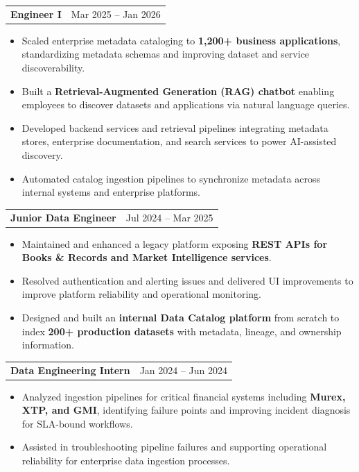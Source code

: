 \documentclass[a4paper,10pt]{article}
\begin{document}
\begin{tabularx}{\linewidth}{@{}Xr@{}}
\hspace*{2mm}\textbf{Engineer I} & Mar 2025 -- Jan 2026 \\
\end{tabularx}
\begin{itemize}[topsep=0pt,leftmargin=6mm]
    \item Scaled enterprise metadata cataloging to \textbf{1,200+ business applications}, standardizing metadata schemas and improving dataset and service discoverability.
    \item Built a \textbf{Retrieval-Augmented Generation (RAG) chatbot} enabling employees to discover datasets and applications via natural language queries.
    \item Developed backend services and retrieval pipelines integrating metadata stores, enterprise documentation, and search services to power AI-assisted discovery.
    \item Automated catalog ingestion pipelines to synchronize metadata across internal systems and enterprise platforms.
\end{itemize}

\vspace{1mm}

\begin{tabularx}{\linewidth}{@{}Xr@{}}
\hspace*{2mm}\textbf{Junior Data Engineer} & Jul 2024 -- Mar 2025 \\
\end{tabularx}
\begin{itemize}[topsep=0pt,leftmargin=6mm]
    \item Maintained and enhanced a legacy platform exposing \textbf{REST APIs for Books \& Records and Market Intelligence services}.
    \item Resolved authentication and alerting issues and delivered UI improvements to improve platform reliability and operational monitoring.
    \item Designed and built an \textbf{internal Data Catalog platform} from scratch to index \textbf{200+ production datasets} with metadata, lineage, and ownership information.
\end{itemize}

\vspace{1mm}

\begin{tabularx}{\linewidth}{@{}Xr@{}}
\hspace*{2mm}\textbf{Data Engineering Intern} & Jan 2024 -- Jun 2024 \\
\end{tabularx}
\begin{itemize}[topsep=0pt,leftmargin=6mm]
    \item Analyzed ingestion pipelines for critical financial systems including \textbf{Murex, XTP, and GMI}, identifying failure points and improving incident diagnosis for SLA-bound workflows.
    \item Assisted in troubleshooting pipeline failures and supporting operational reliability for enterprise data ingestion processes.
\end{itemize}
\vspace{1mm}
\end{document}
